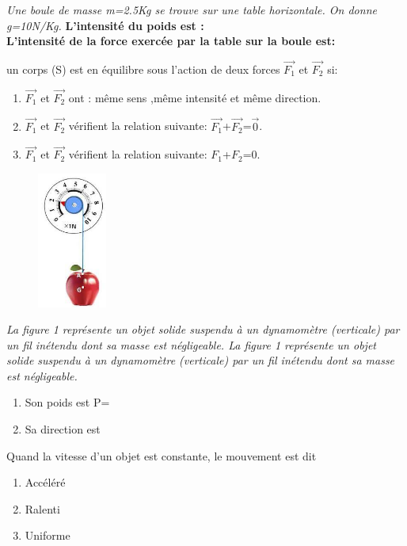 \documentclass[12pt]{article}
\begin{document}
\begin{multicols}{2}
\begin{enumerate}
\item \emph{Une boule de masse m=2.5Kg se trouve sur une table horizontale. On donne g=10N/Kg.}
	\textbf{L’intensité du poids est :}\dotfill
	\\\textbf{L’intensité de la force exercée par la table sur la boule est:}\dotfill
\item un corps (S) est en équilibre sous l’action de deux forces $\vec{F_1}$
et $\vec{F_2}$ si:
\begin{enumerate}
	\item $\vec{F_1}$ et $\vec{F_2}$ ont : même sens ,même intensité et même direction.

	\item $\vec{F_1}$ et $\vec{F_2}$  vérifient la relation suivante: $\vec{F_1}$+$\vec{F_2}$=$\vec{0}$.

	\item $\vec{F_1}$ et $\vec{F_2}$  vérifient la relation suivante: $F_1$+$F_2$=0.
\end{enumerate}

\begin{minipage}{\linewidth} 
\begin{figure} 
\vspace{-12pt} 
\includegraphics[width=0.9in]{./img/dynamo.jpeg}
\vspace{-1cm}
\caption{}
\end{figure} 

\item \emph{La figure 1 représente un objet solide suspendu à un dynamomètre (verticale) par un fil inétendu dont sa masse est
négligeable. La figure  1 représente un
objet solide suspendu à un dynamomètre (verticale) par un fil
inétendu dont sa masse est négligeable.}

\end{minipage}
\begin{enumerate}
	\item Son poids est P=\dotfill
	\item Sa direction est\dotfill
\end{enumerate}
\item Quand la vitesse d’un objet est constante, le mouvement est dit
	\begin{enumerate}
		\item Accéléré
		\item Ralenti
		\item Uniforme
	\end{enumerate}

\end{enumerate}

\end{multicols}
\end{document}
